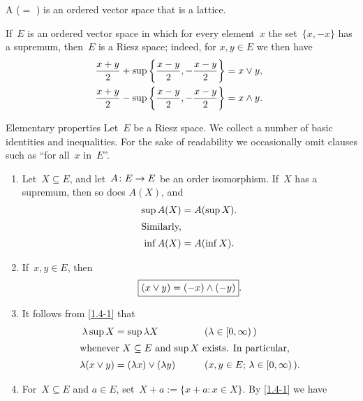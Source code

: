 \documentclass[main.tex]{subfiles}
\begin{document}
%
%
\begin{psec}[Definition]
\label{1.3}
A  ($=$ )
is an ordered vector space that is a lattice.

If~$E$ is an ordered vector space 
in which for every element~$x$
the set~$\{x,-x\}$ has a supremum,
then~$E$ is a Riesz space;
indeed,
for $x,y\in E$
we then have
\begin{align*}
\frac{x+y}{2} + \sup\left\{ \frac{x-y}{2}, -\frac{x-y}{2} \right\} 
  & = x\vee y\textnormal{,} \\ 
\frac{x+y}{2} - \sup\left\{ \frac{x-y}{2}, -\frac{x-y}{2} \right\}
  & = x\wedge y\textnormal{. }
\end{align*}
\end{psec}
%
%
\begin{psec}{Elementary properties}
\label{1.4}
Let~$E$ be a Riesz space. 
We collect a number of basic identities and inequalities.
For the sake of readability
we occasionally omit clauses such as ``for all~$x$ in~$E$''.
\begin{enumerate}
\item %
\label{1.4-1}
Let~$X\subseteq E$, and let~$A\colon E\rightarrow E$ 
be an order isomorphism.
If~$X$ has a supremum,
then so does $A(X)$,
and
\begin{align*}
\sup A(X) &= A(\sup X)
\htam{.} \\
\intertext{%
Similarly, %
}
\inf A(X) &= A(\inf X)
\htam{.}
\end{align*}
\item %
\label{1.4-2}
If~$x,y\in E$, then
\begin{equation*}
\fbox{$  (x\vee y) = (-x)\wedge(-y)  $}
\textnormal{.}
\end{equation*}
\item %
\label{1.4-3}
It follows from \ref{1.4-1} that
\begin{alignat*}
\lambda \sup X &= \sup \lambda X \qquad &&(\lambda \in [0,\infty)\,) \\
\intertext{%
whenever~$X\subseteq E$ and~$\sup X$ exists.
In particular, }
\lambda (x \vee y) &=  (\lambda x) \vee (\lambda y) 
  \qquad &&(x,y\in E\htam{; }\lambda\in[0,\infty)\,)\htam{.}
\end{alignat*}
\item %
\label{1.4-4}
For~$X\subseteq E$ and $a\in E$,
set~$X+a:=\{x+a\colon x\in X\}$.
By \ref{1.4-1} we have
\begin{align*}

\end{align*}
\end{enumerate}
\end{psec}
\end{document}
